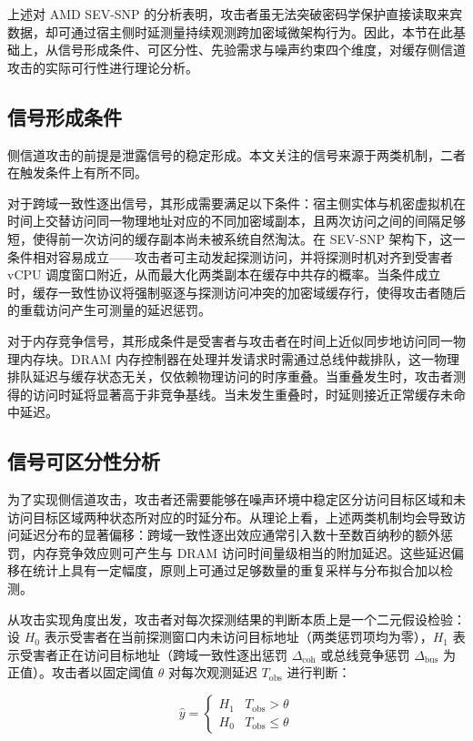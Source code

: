 上述对 AMD SEV-SNP 的分析表明，攻击者虽无法突破密码学保护直接读取来宾数据，却可通过宿主侧时延测量持续观测跨加密域微架构行为。因此，本节在此基础上，从信号形成条件、可区分性、先验需求与噪声约束四个维度，对缓存侧信道攻击的实际可行性进行理论分析。

\subsection{信号形成条件}

侧信道攻击的前提是泄露信号的稳定形成。本文关注的信号来源于两类机制，二者在触发条件上有所不同。

对于跨域一致性逐出信号，其形成需要满足以下条件：宿主侧实体与机密虚拟机在时间上交替访问同一物理地址对应的不同加密域副本，且两次访问之间的间隔足够短，使得前一次访问的缓存副本尚未被系统自然淘汰。在 SEV-SNP 架构下，这一条件相对容易成立——攻击者可主动发起探测访问，并将探测时机对齐到受害者 vCPU 调度窗口附近，从而最大化两类副本在缓存中共存的概率。当条件成立时，缓存一致性协议将强制驱逐与探测访问冲突的加密域缓存行，使得攻击者随后的重载访问产生可测量的延迟惩罚\cite{giner2025coherereload}。

对于内存竞争信号，其形成条件是受害者与攻击者在时间上近似同步地访问同一物理内存块。DRAM 内存控制器在处理并发请求时需通过总线仲裁排队，这一物理排队延迟与缓存状态无关，仅依赖物理访问的时序重叠。当重叠发生时，攻击者测得的访问时延将显著高于非竞争基线。当未发生重叠时，时延则接近正常缓存未命中延迟\cite{chiang2025reloadreload}。

\subsection{信号可区分性分析}

为了实现侧信道攻击，攻击者还需要能够在噪声环境中稳定区分访问目标区域和未访问目标区域两种状态所对应的时延分布。从理论上看，上述两类机制均会导致访问延迟分布的显著偏移：跨域一致性逐出效应通常引入数十至数百纳秒的额外惩罚，内存竞争效应则可产生与 DRAM 访问时间量级相当的附加延迟。这些延迟偏移在统计上具有一定幅度，原则上可通过足够数量的重复采样与分布拟合加以检测\cite{chiang2025reloadreload,giner2025coherereload}。

从攻击实现角度出发，攻击者对每次探测结果的判断本质上是一个二元假设检验：设 $H_0$ 表示受害者在当前探测窗口内未访问目标地址（两类惩罚项均为零），$H_1$ 表示受害者正在访问目标地址（跨域一致性逐出惩罚 $\Delta_\text{coh}$ 或总线竞争惩罚 $\Delta_\text{bus}$ 为正值）。攻击者以固定阈值 $\theta$ 对每次观测延迟 $T_\text{obs}$ 进行判断：

\begin{equation}
  \hat{y} =
  \begin{cases} H_1 & T_\text{obs} > \theta \\ H_0 & T_\text{obs} \leq \theta
  \end{cases}
  \label{eq:threshold_detect}
\end{equation}

